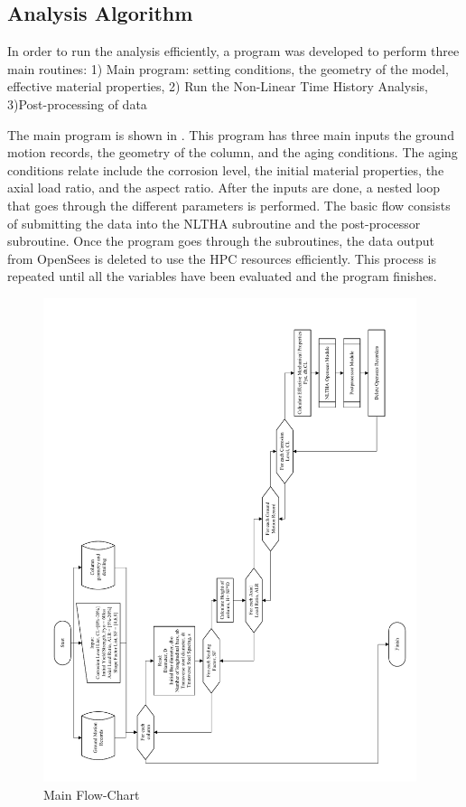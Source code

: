 \subsection{Analysis Algorithm}

In order to run the analysis efficiently, a program was developed to perform three main routines:
1) Main program: setting conditions, the geometry of the model, effective material properties, 2) Run the Non-Linear Time History Analysis, 3)Post-processing of data

The main program is shown in . This program has three main inputs the ground motion records, the geometry of the column, and the aging conditions. The aging conditions relate include the corrosion level, the initial material properties, the axial load ratio, and the aspect ratio. After the inputs are done, a nested loop that goes through the different parameters is performed. The basic flow consists of submitting the data into the NLTHA subroutine and the post-processor subroutine. Once the program goes through the subroutines, the data output from OpenSees is deleted to use the HPC resources efficiently. This process is repeated until all the variables have been evaluated and the program finishes.

\begin{figure}[htp]
	\centering
	\includegraphics[width=0.975\textwidth]{VAC Thesis 2.0/Chapter-5/figs/Main_FlowChart_01.pdf}
	\caption{Main Flow-Chart}
	\label{fig:main_flowchart}
\end{figure}

